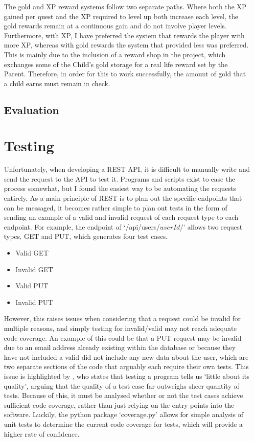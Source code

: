 The gold and XP reward systems follow two separate paths.
Where both the XP gained per quest and the XP required to level up both increase each level, the gold rewards remain at a continuous gain and do not involve player levels.
Furthermore, with XP, I have preferred the system that rewards the player with more XP, whereas with gold rewards the system that provided less was preferred.
This is mainly due to the inclusion of a reward shop in the project, which exchanges some of the Child's gold storage for a real life reward set by the Parent. 
Therefore, in order for this to work successfully, the amount of gold that a child earns must remain in check.

\subsection{Evaluation}



\section{Testing}
Unfortunately, when developing a REST API, it is difficult to manually write and send the request to the API to test it.
Programs and scripts exist to ease the process somewhat, but I found the easiest way to be automating the requests entirely. 
As a main principle of REST is to plan out the specific endpoints that can be messaged, it becomes rather simple to plan out tests in the form of sending an example of a valid and invalid request of each request type to each endpoint.
For example, the endpoint of `/api/users/$userId$/' allows two request types, GET and PUT, which generates four test cases.
\begin{itemize}
	\item{Valid GET}
	\item{Invalid GET}
	\item{Valid PUT}
	\item{Invalid PUT}
\end{itemize}  

However, this raises issues when considering that a request could be invalid for multiple reasons, and simply testing for invalid/valid may not reach adequate code coverage.
An example of this could be that a PUT request may be invalid due to an email address already existing within the database or because they have not included a valid did not include any new data about the user, which are two separate sections of the code that arguably each require their own tests.
This issue is highlighted by \cite{4597151}, who states that testing a program tells us `little about its quality', arguing that the quality of a test case far outweighs sheer quantity of tests.
Because of this, it must be analysed whether or not the test cases achieve sufficient code coverage, rather than just relying on the entry points into the software.
Luckily, the python package `coverage.py' allows for simple analysis of unit tests to determine the current code coverage for tests, which will provide a higher rate of confidence.

